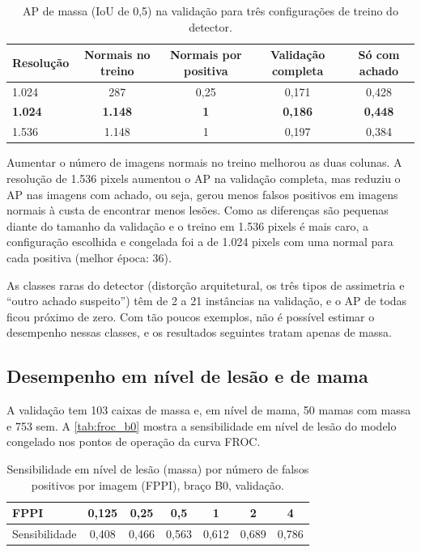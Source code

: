 \begin{table}[htb]
  \centering
  \caption{AP de massa (IoU de 0,5) na validação para três configurações de treino do detector.}
  \label{tab:runs_detector}
  \small
  \begin{tabular}{@{}lcccc@{}}
    \toprule
    Resolução & Normais no treino & Normais por positiva & Validação completa & Só com achado \\
    \midrule
    1.024 & 287 & 0,25 & 0,171 & 0,428 \\
    \textbf{1.024} & \textbf{1.148} & \textbf{1} & \textbf{0,186} & \textbf{0,448} \\
    1.536 & 1.148 & 1 & 0,197 & 0,384 \\
    \bottomrule
  \end{tabular}
\end{table}

Aumentar o número de imagens normais no treino melhorou as duas colunas. A resolução de 1.536 pixels aumentou o AP na validação completa, mas reduziu o AP nas imagens com achado, ou seja, gerou menos falsos positivos em imagens normais à custa de encontrar menos lesões. Como as diferenças são pequenas diante do tamanho da validação e o treino em 1.536 pixels é mais caro, a configuração escolhida e congelada foi a de 1.024 pixels com uma normal para cada positiva (melhor época: 36).

As classes raras do detector (distorção arquitetural, os três tipos de assimetria e ``outro achado suspeito'') têm de 2 a 21 instâncias na validação, e o AP de todas ficou próximo de zero. Com tão poucos exemplos, não é possível estimar o desempenho nessas classes, e os resultados seguintes tratam apenas de massa.

\subsection{Desempenho em nível de lesão e de mama}

A validação tem 103 caixas de massa e, em nível de mama, 50 mamas com massa e 753 sem. A \autoref{tab:froc_b0} mostra a sensibilidade em nível de lesão do modelo congelado nos pontos de operação da curva FROC.

\begin{table}[htb]
  \centering
  \caption{Sensibilidade em nível de lesão (massa) por número de falsos positivos por imagem (FPPI), braço B0, validação.}
  \label{tab:froc_b0}
  \begin{tabular}{@{}lcccccc@{}}
    \toprule
    FPPI & 0,125 & 0,25 & 0,5 & 1 & 2 & 4 \\
    \midrule
    Sensibilidade & 0,408 & 0,466 & 0,563 & 0,612 & 0,689 & 0,786 \\
    \bottomrule
  \end{tabular}
\end{table}


